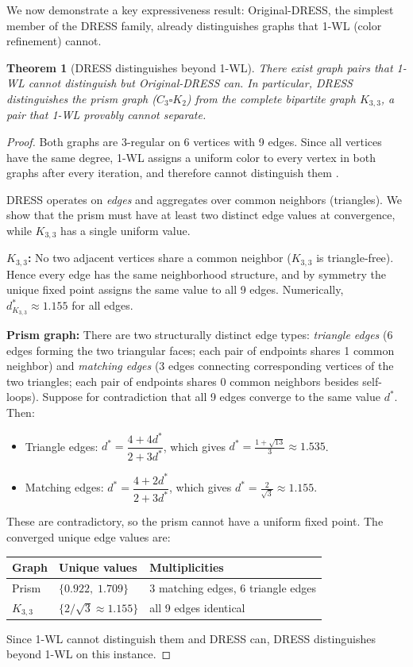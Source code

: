 \documentclass[11pt,a4paper]{article}
\newtheorem{theorem}{Theorem}
\begin{document}
We now demonstrate a key expressiveness result: Original-DRESS, the simplest member of the DRESS family, already distinguishes graphs that 1-WL (color refinement) cannot.

\begin{theorem}[DRESS distinguishes beyond 1-WL]
\label{thm:dress-gt-1wl}
There exist graph pairs that 1-WL cannot distinguish but Original-DRESS can.
In particular, DRESS distinguishes the prism graph ($C_3 \square K_2$) from the complete bipartite graph $K_{3,3}$, a pair that 1-WL provably cannot separate.
\end{theorem}

\begin{proof}
Both graphs are 3-regular on 6 vertices with 9 edges. Since all vertices have the same degree, 1-WL assigns a uniform color to every vertex in both graphs after every iteration, and therefore cannot distinguish them \cite{cai1992optimal}.

DRESS operates on \emph{edges} and aggregates over common neighbors (triangles). We show that the prism must have at least two distinct edge values at convergence, while $K_{3,3}$ has a single uniform value.

\textbf{$K_{3,3}$:} No two adjacent vertices share a common neighbor ($K_{3,3}$ is triangle-free). Hence every edge has the same neighborhood structure, and by symmetry the unique fixed point assigns the same value to all 9 edges. Numerically, $d^*_{K_{3,3}} \approx 1.155$ for all edges.

\textbf{Prism graph:} There are two structurally distinct edge types: \emph{triangle edges} (6 edges forming the two triangular faces; each pair of endpoints shares 1 common neighbor) and \emph{matching edges} (3 edges connecting corresponding vertices of the two triangles; each pair of endpoints shares 0 common neighbors besides self-loops). Suppose for contradiction that all 9 edges converge to the same value $d^*$. Then:
\begin{itemize}
    \item Triangle edges: $d^* = \dfrac{4 + 4d^*}{2 + 3d^*}$, which gives $d^* = \frac{1+\sqrt{13}}{3} \approx 1.535$.
    \item Matching edges: $d^* = \dfrac{4 + 2d^*}{2 + 3d^*}$, which gives $d^* = \frac{2}{\sqrt{3}} \approx 1.155$.
\end{itemize}
These are contradictory, so the prism cannot have a uniform fixed point. The converged unique edge values are:

\smallskip
\begin{center}
\begin{tabular}{lll}
\textbf{Graph} & \textbf{Unique values} & \textbf{Multiplicities} \\
\hline
Prism & $\{0.922,\; 1.709\}$ & 3 matching edges, 6 triangle edges \\
$K_{3,3}$ & $\{2/\sqrt{3} \approx 1.155\}$ & all 9 edges identical \\
\end{tabular}
\end{center}
\smallskip

Since 1-WL cannot distinguish them and DRESS can, DRESS distinguishes beyond 1-WL on this instance.
\end{proof}
\end{document}
